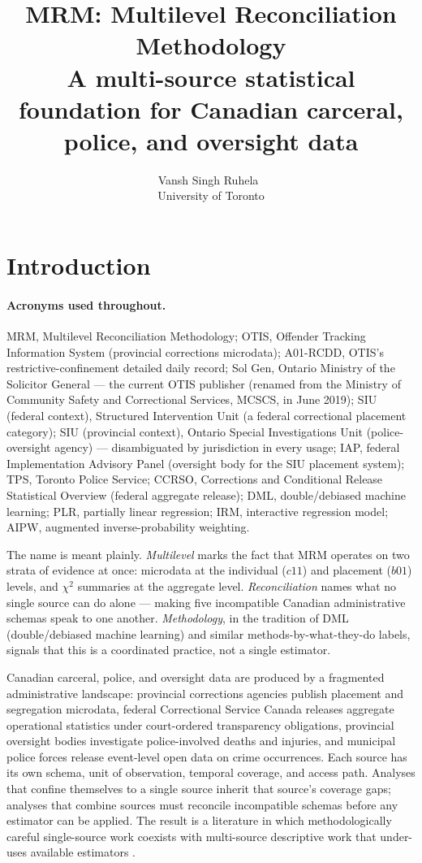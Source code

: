 \documentclass[article,shortnames,nojss]{jss}
\title{MRM: Multilevel Reconciliation Methodology \\ \large A multi-source statistical foundation for Canadian carceral, police, and oversight data}
\author{Vansh Singh Ruhela~\orcidlink{0009-0004-1750-3592}\\University of Toronto}
\begin{document}
\sloppy

\section{Introduction}
\label{sec:intro}

\paragraph*{Acronyms used throughout.}
MRM, Multilevel Reconciliation Methodology;
OTIS, Offender Tracking Information System (provincial corrections microdata);
A01-RCDD, OTIS's restrictive-confinement detailed daily record;
Sol Gen, Ontario Ministry of the Solicitor General --- the current OTIS publisher (renamed from the Ministry of Community Safety and Correctional Services, MCSCS, in June 2019);
SIU (federal context), Structured Intervention Unit (a federal correctional placement category);
SIU (provincial context), Ontario Special Investigations Unit (police-oversight agency) --- disambiguated by jurisdiction in every usage;
IAP, federal Implementation Advisory Panel (oversight body for the SIU placement system);
TPS, Toronto Police Service;
CCRSO, Corrections and Conditional Release Statistical Overview (federal aggregate release);
DML, double/debiased machine learning;
PLR, partially linear regression;
IRM, interactive regression model;
AIPW, augmented inverse-probability weighting.

The name is meant plainly. \emph{Multilevel} marks the fact that
MRM operates on two strata of evidence at once: microdata at the
individual ($c11$) and placement ($b01$) levels, and $\chi^{2}$
summaries at the aggregate level. \emph{Reconciliation} names
what no single source can do alone --- making five incompatible
Canadian administrative schemas speak to one another.
\emph{Methodology}, in the tradition of DML (double/debiased
machine learning) and similar methods-by-what-they-do labels,
signals that this is a coordinated practice, not a single
estimator.

Canadian carceral, police, and oversight data are produced by a
fragmented administrative landscape: provincial corrections agencies
publish placement and segregation microdata, federal Correctional
Service Canada releases aggregate operational statistics under
court-ordered transparency obligations, provincial oversight bodies
investigate police-involved deaths and injuries, and municipal
police forces release event-level open data on crime occurrences.
Each source has its own schema, unit of observation, temporal
coverage, and access path. Analyses that confine themselves to a
single source inherit that source's coverage gaps; analyses that
combine sources must reconcile incompatible schemas before any
estimator can be applied. The result is a literature in which
methodologically careful single-source work coexists with
multi-source descriptive work that under-uses available estimators
\citep{Doob2023, ZorroMedina2023JMP, SprottDoob2021}.
\end{document}
